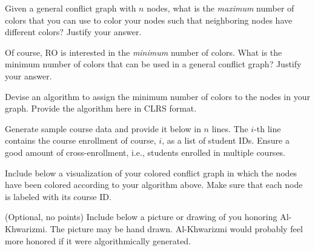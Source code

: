 \documentclass[a4paper]{exam}
\begin{document}
\begin{questions}

\question
  Given a general conflict graph with $n$ nodes, what is the \textit{maximum} number of colors that you can use to color your nodes such that neighboring nodes have different colors? Justify your answer.
  \begin{solution}
    
  \end{solution}
\question
  Of course, RO is interested in the \textit{minimum} number of colors. What is the minimum number of colors that can be used in a general conflict graph? Justify your answer.
  \begin{solution}
    
  \end{solution}

\question
  Devise an algorithm to assign the minimum number of colors to the nodes in your graph. Provide the algorithm here in CLRS format.
  \begin{solution}
    
  \end{solution}

\question
  Generate sample course data and provide it below in $n$ lines. The $i$-th line contains the course enrollment of course, $i$, as a list of student IDs. Ensure a good amount of cross-enrollment, i.e., students enrolled in multiple courses.
  \begin{solution}
    
  \end{solution}

\question
  Include below a visualization of your colored conflict graph in which the nodes have been colored according to your algorithm above. Make sure that each node is labeled with its course ID.
  \begin{solution}
    
  \end{solution}

  \bonusquestion (Optional, no points)
  Include below a picture or drawing of you honoring Al-Khwarizmi. The picture may be hand drawn. Al-Khwarizmi would probably feel more honored if it were algorithmically generated.
  \begin{solution}
    
  \end{solution}  
\end{questions}
\end{document}
